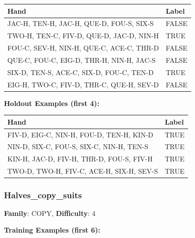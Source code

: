 \documentclass[10pt,a4paper]{article}
\begin{document}
\begin{small}
\begin{tabular}{p{8cm}l}
\toprule
Hand & Label \\
\midrule
JAC-H, TEN-H, JAC-H, QUE-D, FOU-S, SIX-S & \textcolor{negative}{FALSE} \\
TWO-H, TEN-C, FIV-D, QUE-D, JAC-D, NIN-H & \textcolor{positive}{TRUE} \\
FOU-C, SEV-H, NIN-H, QUE-C, ACE-C, THR-D & \textcolor{negative}{FALSE} \\
QUE-C, FOU-C, EIG-D, THR-H, NIN-H, JAC-S & \textcolor{negative}{FALSE} \\
SIX-D, TEN-S, ACE-C, SIX-D, FOU-C, TEN-D & \textcolor{positive}{TRUE} \\
EIG-H, TWO-C, FIV-D, THR-C, QUE-H, SEV-D & \textcolor{negative}{FALSE} \\
\bottomrule
\end{tabular}
\end{small}

\textbf{Holdout Examples (first 4):}

\begin{small}
\begin{tabular}{p{8cm}l}
\toprule
Hand & Label \\
\midrule
FIV-D, EIG-C, NIN-H, FOU-D, TEN-H, KIN-D & \textcolor{positive}{TRUE} \\
NIN-D, SIX-C, FOU-S, SIX-C, NIN-H, TEN-S & \textcolor{positive}{TRUE} \\
KIN-H, JAC-D, FIV-H, THR-D, FOU-S, FIV-H & \textcolor{positive}{TRUE} \\
TWO-D, TWO-H, FIV-C, ACE-H, SIX-H, SEV-S & \textcolor{positive}{TRUE} \\
\bottomrule
\end{tabular}
\end{small}

\vspace{0.5cm}

\subsubsection{Halves\_copy\_suits}

\textbf{Family}: COPY, \textbf{Difficulty}: 4

\textbf{Training Examples (first 6):}
\end{document}
